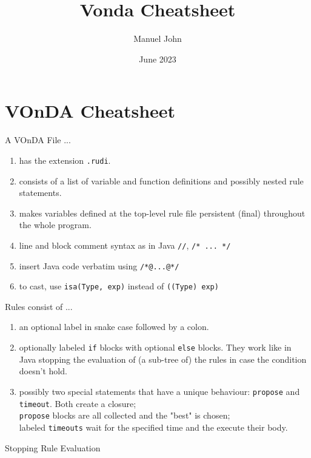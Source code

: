 \documentclass[5pt]{article}
\title{Vonda Cheatsheet}
\author{Manuel John}
\date{June 2023}
\begin{document}
\singlespacing\pagestyle{empty}
\section*{\centering VOnDA Cheatsheet}
    \begin{multicols}{2}
        \begin{bodybox}{A VOnDA File ...}
        \normalsize
        \begin{enumerate}[label=...]
        \itemsep0.15em
             \item has the extension \verb|.rudi|.
             \item  consists of a list of variable and function definitions and possibly nested rule statements.
             \item  makes variables defined at the top-level rule file persistent (final) throughout the whole program.
             \item line and block comment syntax as in Java \verb|//|,
               \verb|/* ... */|
             \item insert Java code verbatim using \verb|/*@...@*/|
             \item to cast, use \verb|isa(Type, exp)| instead of \verb|((Type) exp)|
        \end{enumerate}
        \end{bodybox}
        \begin{bodybox}{Rules consist of ...}
        \begin{enumerate}[label=...]
        \itemsep0.15em
            \item an optional label in snake case followed by a colon.
            \item optionally labeled \verb|if| blocks with optional \verb|else| blocks. They work like in Java stopping the evaluation of (a sub-tree of) the rules in case the condition doesn't hold.
            \item possibly two special statements that have a unique behaviour: \verb|propose| and \verb|timeout|. Both create a closure;\\
            \verb|propose| blocks are all collected and the "best" is chosen;\\
            labeled \verb|timeouts| wait for the specified time and the execute their body.
        \end{enumerate}
        \end{bodybox}
        \begin{bodybox}{Stopping Rule Evaluation}

\end{bodybox}
\end{multicols}
\end{document}
